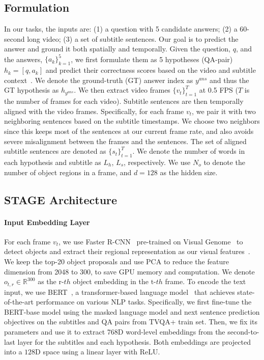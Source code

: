\documentclass[11pt,a4paper]{article}
\begin{document}
\subsection{Formulation}\label{sec:method_formulation}
In our tasks, the inputs are: (1) a question with 5 candidate answers; (2) a 60-second long video; (3) a set of subtitle sentences. 
Our goal is to predict the answer and ground it both spatially and temporally.
Given the question, $q$, and the answers, $\{a_{k}\}_{k=1}^{5}$, we first formulate them as 5 hypotheses (QA-pair) $h_{k} = [q, a_k]$ and predict their correctness scores based on the video and subtitle context~\cite{Onishi2016WhoDW}. 
We denote the ground-truth (GT) answer index as $y^\mathit{ans}$ and thus the GT hypothesis as $h_{y^\mathit{ans}}$.
We then extract video frames $\{v_t\}_{t=1}^{T}$ at 0.5 FPS ($T$ is the number of frames for each video). 
Subtitle sentences are then temporally aligned with the video frames.
Specifically, for each frame $v_t$, we pair it with two neighboring sentences based on the subtitle timestamps. 
We choose two neighbors since this keeps most of the sentences at our current frame rate, and also avoids severe misalignment between the frames and the sentences.
The set of aligned subtitle sentences are denoted as $\{s_t\}_{t=1}^{T}$. 
We denote the number of words in each hypothesis and subtitle as $L_h$, $L_s$, respectively. 
We use $N_o$ to denote the number of object regions in a frame, and $d=128$ as the hidden size. 

\subsection{STAGE Architecture}\label{sec:arch}
\paragraph{Input Embedding Layer} 
For each frame $v_t$, we use Faster R-CNN~\cite{Ren2015FasterRT} pre-trained on Visual Genome~\cite{krishna2017visual} to detect objects and extract their regional representation as our visual features~\cite{Anderson2017BottomUpAT}.
We keep the top-20 object proposals and use PCA to reduce the feature dimension from 2048 to 300, to save GPU memory and computation. 
We denote $o_{t,r} \in \mathbb{R}^{300}$ as the $\text{r}\mbox{-}th$ object embedding in the $\text{t}\mbox{-}th$ frame. 
To encode the text input, we use BERT~\cite{Devlin2018BERTPO}, a transformer-based language model~\cite{Vaswani2017AttentionIA} that achieves state-of-the-art performance on various NLP tasks. 
Specifically, we first fine-tune the BERT-base model using the masked language model and next sentence prediction objectives on the subtitles and QA pairs from TVQA+ train set. 
Then, we fix its parameters and use it to extract 768D word-level embeddings from the second-to-last layer for the subtitles and each hypothesis. 
Both embeddings are projected into a $128$D space using a linear layer with ReLU.
\end{document}
